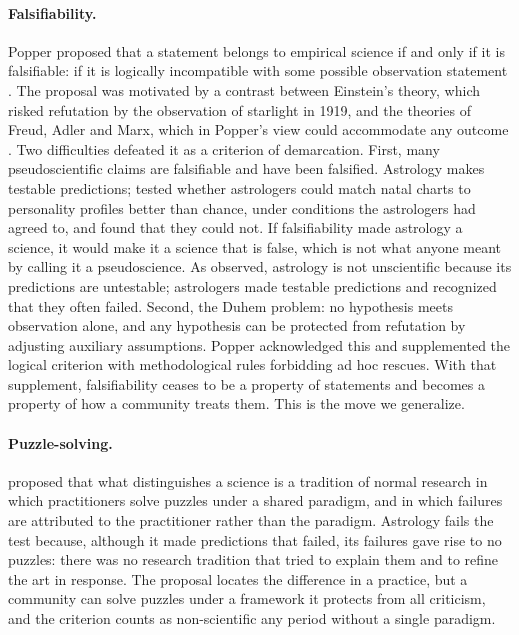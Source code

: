 \documentclass{situationist-preprint}
\begin{document}
\paragraph{Falsifiability.} Popper proposed that a statement belongs to empirical science if and only if it is falsifiable: if it is logically incompatible with some possible observation statement \citep{Popper1959}. The proposal was motivated by a contrast between Einstein's theory, which risked refutation by the observation of starlight in 1919, and the theories of Freud, Adler and Marx, which in Popper's view could accommodate any outcome \citep[ch.~1]{Popper1963}. Two difficulties defeated it as a criterion of demarcation. First, many pseudoscientific claims are falsifiable and have been falsified. Astrology makes testable predictions; \citet{Carlson1985} tested whether astrologers could match natal charts to personality profiles better than chance, under conditions the astrologers had agreed to, and found that they could not. If falsifiability made astrology a science, it would make it a science that is false, which is not what anyone meant by calling it a pseudoscience. As \citet{Kuhn1970} observed, astrology is not unscientific because its predictions are untestable; astrologers made testable predictions and recognized that they often failed. Second, the Duhem problem: no hypothesis meets observation alone, and any hypothesis can be protected from refutation by adjusting auxiliary assumptions. Popper acknowledged this and supplemented the logical criterion with methodological rules forbidding ad hoc rescues. With that supplement, falsifiability ceases to be a property of statements and becomes a property of how a community treats them. This is the move we generalize.

\paragraph{Puzzle-solving.} \citet{Kuhn1970} proposed that what distinguishes a science is a tradition of normal research in which practitioners solve puzzles under a shared paradigm, and in which failures are attributed to the practitioner rather than the paradigm. Astrology fails the test because, although it made predictions that failed, its failures gave rise to no puzzles: there was no research tradition that tried to explain them and to refine the art in response. The proposal locates the difference in a practice, but a community can solve puzzles under a framework it protects from all criticism, and the criterion counts as non-scientific any period without a single paradigm.
\end{document}
